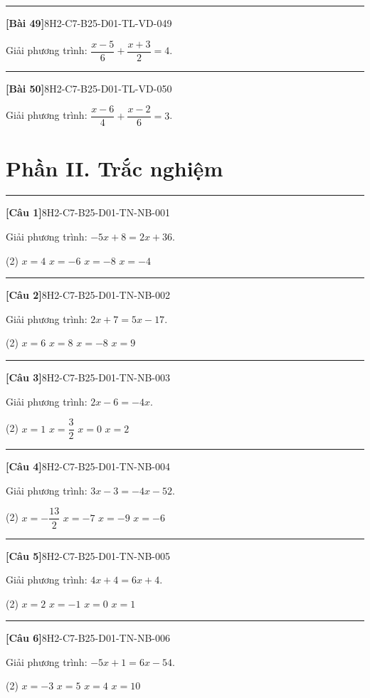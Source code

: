 \documentclass[12pt,a4paper]{article}
\newif\ifloigiai
\newenvironment{cauhoi}[2]{%
  \par\medskip\noindent\rule{\textwidth}{0.4pt}\par\nopagebreak
  \noindent\textbf{[#1]}\hfill{\scriptsize\ttfamily #2}\par\nopagebreak\smallskip}{\par}
\newcommand{\loigiai}[1]{\ifloigiai\par\smallskip\noindent\textit{Lời giải.} #1\par\fi}
\newcommand{\dapan}[1]{\ifloigiai\par\smallskip\noindent\textit{Đáp án:} \textbf{#1}\par\fi}
\begin{document}
\begin{cauhoi}{Bài 49}{8H2-C7-B25-D01-TL-VD-049}
Giải phương trình: $\dfrac{x - 5}{6}+\dfrac{x + 3}{2}=4$.
\loigiai{Quy đồng, nhân hai vế với $6$: $(x - 5)+3(x + 3)=24$, tức là $4x + 4=24$. Suy ra $4x=20$, nên $x=5$.}
\end{cauhoi}
\begin{cauhoi}{Bài 50}{8H2-C7-B25-D01-TL-VD-050}
Giải phương trình: $\dfrac{x - 6}{4}+\dfrac{x - 2}{6}=3$.
\loigiai{Quy đồng, nhân hai vế với $12$: $3(x - 6)+2(x - 2)=36$, tức là $5x - 22=36$. Suy ra $5x=58$, nên $x=\dfrac{58}{5}$.}
\end{cauhoi}
\clearpage\section*{Phần II. Trắc nghiệm}
\begin{cauhoi}{Câu 1}{8H2-C7-B25-D01-TN-NB-001}
Giải phương trình: $-5x + 8=2x + 36$.
\begin{tasks}(2)
\task $x=4$
\task $x=-6$
\task $x=-8$
\task $x=-4$
\end{tasks}
\dapan{D}
\end{cauhoi}
\begin{cauhoi}{Câu 2}{8H2-C7-B25-D01-TN-NB-002}
Giải phương trình: $2x + 7=5x - 17$.
\begin{tasks}(2)
\task $x=6$
\task $x=8$
\task $x=-8$
\task $x=9$
\end{tasks}
\dapan{B}
\end{cauhoi}
\begin{cauhoi}{Câu 3}{8H2-C7-B25-D01-TN-NB-003}
Giải phương trình: $2x - 6=-4x$.
\begin{tasks}(2)
\task $x=1$
\task $x=\dfrac{3}{2}$
\task $x=0$
\task $x=2$
\end{tasks}
\dapan{A}
\end{cauhoi}
\begin{cauhoi}{Câu 4}{8H2-C7-B25-D01-TN-NB-004}
Giải phương trình: $3x - 3=-4x - 52$.
\begin{tasks}(2)
\task $x=-\dfrac{13}{2}$
\task $x=-7$
\task $x=-9$
\task $x=-6$
\end{tasks}
\dapan{B}
\end{cauhoi}
\begin{cauhoi}{Câu 5}{8H2-C7-B25-D01-TN-NB-005}
Giải phương trình: $4x + 4=6x + 4$.
\begin{tasks}(2)
\task $x=2$
\task $x=-1$
\task $x=0$
\task $x=1$
\end{tasks}
\dapan{C}
\end{cauhoi}
\begin{cauhoi}{Câu 6}{8H2-C7-B25-D01-TN-NB-006}
Giải phương trình: $-5x + 1=6x - 54$.
\begin{tasks}(2)
\task $x=-3$
\task $x=5$
\task $x=4$
\task $x=10$
\end{tasks}
\dapan{B}
\end{cauhoi}
\end{document}
